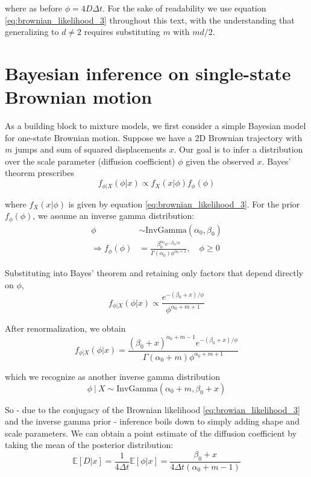 \documentclass{article}
\begin{document}
where as before $\phi = 4 D \Delta t$.
For the sake of readability we use equation \ref{eq:brownian_likelihood_3}
throughout this text, with the understanding that generalizing to $d \neq 2$
requires substituting $m$ with $md / 2$.

\section{Bayesian inference on single-state Brownian motion}

As a building block to mixture models, we first consider a simple
Bayesian model for one-state Brownian motion. Suppose we have a
2D Brownian trajectory with $m$ jumps and sum of squared displacements $x$.
Our goal is to infer a distribution over the scale parameter (diffusion
coefficient) $\phi$ given the observed $x$. Bayes' theorem prescribes
\[
    f_{\phi | X}(\phi | x) \propto f_{X}(x | \phi) f_{\phi}(\phi)
\]

where $f_{X}(x | \phi)$ is given by equation \ref{eq:brownian_likelihood_3}.
For the prior $f_{\phi}(\phi)$, we assume an inverse gamma distribution:
\begin{align*}
    \phi &\sim \text{InvGamma} \left( \alpha_{0}, \beta_{0} \right) \\
    \Rightarrow f_{\phi} \left( \phi \right) &= \frac{\beta_{0}^{\alpha_{0}} e^{-\beta_{0} / \phi}}{\Gamma \left( \alpha_{0} \right) \phi^{\alpha_{0} + 1} }, \quad \phi \geq 0
\end{align*}

Substituting into Bayes' theorem and retaining only factors that depend
directly on $\phi$,
\[
    f_{\phi | X} (\phi | x) \propto \frac{
        e^{-(\beta_{0} + x) / \phi}
    }{
        \phi^{\alpha_{0} + m + 1}
    }
\]

After renormalization, we obtain
\[
    f_{\phi | X} (\phi | x) = \frac{ (\beta_{0} + x)^{\alpha_{0}+m-1} e^{-(\beta_{0} + x) / \phi}}{\Gamma (\alpha_{0} + m) \phi^{\alpha_{0} + m + 1}}
\]

which we recognize as another inverse gamma distribution
\[
    \phi \ | \ X \sim \text{InvGamma} \left( \alpha_{0} + m, \beta_{0} + x \right)
\]

So - due to the conjugacy of the Brownian likelihood \ref{eq:browian_likelihood_3}
and the inverse gamma prior - inference boils down to simply adding
shape and scale parameters. We can obtain a point estimate of the
diffusion coefficient by taking the mean of the posterior distribution:
\[
    \mathbb{E} \left[ D | x \right] = \frac{1}{4 \Delta t} \mathbb{E} \left[ \phi | x \right] = \frac{\beta_{0} + x}{4 \Delta t \left( \alpha_{0} + m - 1 \right)}
\]
\end{document}
